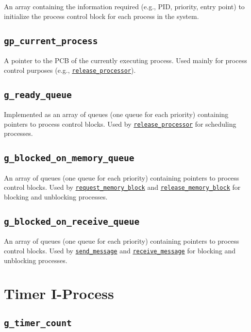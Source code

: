 \documentclass[12pt]{report}
\begin{document}
An array containing the information required (e.g., PID, priority, entry point) to initialize the process control block for each process in the system.

\subsection{\texttt{gp_current_process}}

A pointer to the PCB of the currently executing process. Used mainly for process control purposes (e.g., \hyperref[alg:releasingtheprocessor]{\texttt{release_processor}}).

\subsection{\texttt{g_ready_queue}}

Implemented as an array of queues (one queue for each priority) containing pointers to process control blocks. Used by \hyperref[alg:releasingtheprocessor]{\texttt{release_processor}} for scheduling processes.

\subsection{\texttt{g_blocked_on_memory_queue}}

An array of queues (one queue for each priority) containing pointers to process control blocks. Used by \hyperref[alg:requestingmemoryblocks]{\texttt{request_memory_block}} and \hyperref[alg:releasingmemoryblocks]{\texttt{release_memory_block}} for blocking and unblocking processes.

\subsection{\texttt{g_blocked_on_receive_queue}}

An array of queues (one queue for each priority) containing pointers to process control blocks. Used by \hyperref[alg:sendingmessages]{\texttt{send_message}} and \hyperref[alg:receivingmessages]{\texttt{receive_message}} for blocking and unblocking processes.

\section{Timer I-Process}

\subsection{\texttt{g_timer_count}}
\label{app:gtimercount}
\end{document}
